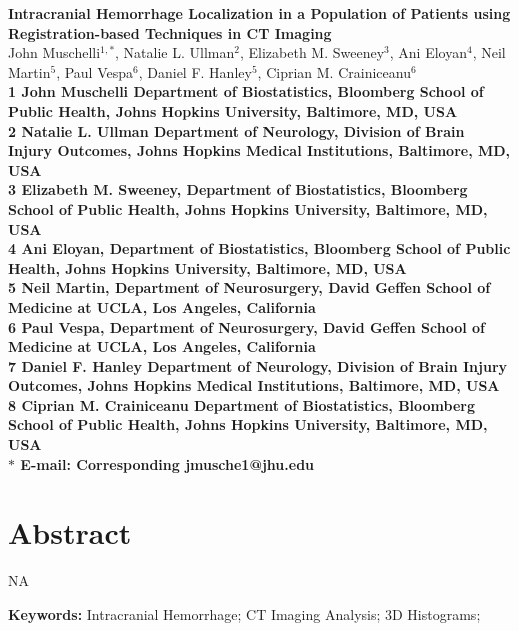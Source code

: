 \documentclass[10pt]{article}\usepackage[]{graphicx}\usepackage[]{color}
\date{}
\begin{document}
\begin{flushleft}
{\Large
\textbf{Intracranial Hemorrhage Localization in a Population of Patients using Registration-based Techniques in CT Imaging}
}
\\
John Muschelli$^{1,\ast}$,  
Natalie L. Ullman$^{2}$,
Elizabeth M. Sweeney$^{3}$,
Ani Eloyan$^{4}$,
Neil Martin$^{5}$,
Paul Vespa$^{6}$,
Daniel F. Hanley$^{5}$,
Ciprian M. Crainiceanu$^{6}$
\\
\bf{1} John Muschelli Department of Biostatistics, Bloomberg School of Public Health, Johns Hopkins University, Baltimore, MD, USA
\\
\bf{2} Natalie L. Ullman Department of Neurology, Division of Brain Injury Outcomes,  Johns Hopkins Medical Institutions, Baltimore, MD, USA
\\
\bf{3} Elizabeth M. Sweeney, Department of Biostatistics, Bloomberg School of Public Health, Johns Hopkins University, Baltimore, MD, USA
\\
\bf{4} Ani Eloyan, Department of Biostatistics, Bloomberg School of Public Health, Johns Hopkins University, Baltimore, MD, USA
\\
\bf{5} Neil Martin, Department of Neurosurgery, David Geffen School of Medicine at UCLA, Los Angeles, California
\\
\bf{6} Paul Vespa, Department of Neurosurgery, David Geffen School of Medicine at UCLA, Los Angeles, California
\\
\bf{7} Daniel F. Hanley Department of Neurology, Division of Brain Injury Outcomes,  Johns Hopkins Medical Institutions, Baltimore, MD, USA
\\
\bf{8} Ciprian M. Crainiceanu Department of Biostatistics, Bloomberg School of Public Health, Johns Hopkins University, Baltimore, MD, USA
\\
$\ast$ E-mail: Corresponding jmusche1@jhu.edu
\end{flushleft}

\section*{Abstract}

NA

{\bf Keywords:} Intracranial Hemorrhage; CT Imaging Analysis; 3D Histograms;
\end{document}
